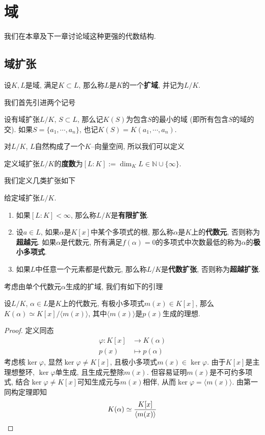 \chapter{域}\label{field}
我们在本章及下一章讨论域这种更强的代数结构.

\section{域扩张}

\begin{defn}
    设$K,L$是域, 满足$K\subset L$, 那么称$L$是$K$的一个\textbf{扩域}, 并记为$L/K$.
\end{defn}

我们首先引进两个记号
\begin{sym}
    设有域扩张$L/K$, $S\subset L$, 那么记$K(S)$为包含$S$的最小的域 (即所有包含$S$的域的交).
    如果$S=\{a_1,\cdots,a_n\}$, 也记$K(S)=K(a_1,\cdots,a_n)$.
\end{sym}

对$L/K$, $L$自然构成了一个$K$--向量空间, 所以我们可以定义
\begin{defn}
    定义域扩张$L/K$的\textbf{度数}为$[L:K]:=\dim_K{L}\in\mathbb{N}\cup\{\infty\}$.
\end{defn}

我们定义几类扩张如下
\begin{defn}
    给定域扩张$L/K$.
    \begin{enumerate}[(1)]
        \item 如果$[L:K]<\infty$, 那么称$L/K$是\textbf{有限扩张}.
        \item 设$a\in L$, 如果$\alpha$是$K[x]$中某个多项式的根, 那么称$\alpha$是$K$上的\textbf{代数元}, 否则称为\textbf{超越元}.
        如果$\alpha$是代数元, 所有满足$f(\alpha)=0$的多项式中次数最低的称为$\alpha$的\textbf{极小多项式}.
        \item 如果$L$中任意一个元素都是代数元, 那么称$L/K$是\textbf{代数扩张}, 否则称为\textbf{超越扩张}.
    \end{enumerate}
\end{defn}

考虑由单个代数元$\alpha$生成的扩域, 我们有如下的引理
\begin{lem}
    设$L/K$, $\alpha\in L$是$K$上的代数元, 有极小多项式$m(x)\in K[x]$, 那么$K(\alpha)\simeq K[x]/\langle m(x)\rangle$, 其中$\langle m(x)\rangle$是$p(x)$生成的理想.
\end{lem}
\begin{proof}
    定义同态
    \begin{align*}
        \varphi:K[x]&\to K(\alpha)\\
        p(x)&\mapsto p(\alpha)
    \end{align*}
    考虑核$\ker\varphi$, 显然$\ker\varphi\neq K[x]$, 且极小多项式$m(x)\in\ker\varphi$.
    由于$K[x]$是主理想整环, $\ker\varphi$单生成, 且生成元整除$m(x)$.
    但容易证明$m(x)$是不可约多项式, 结合$\ker\varphi\neq K[x]$可知生成元与$m(x)$相伴, 从而$\ker\varphi=\langle m(x)\rangle$.
    由第一同构定理即知
    \[K(\alpha)\simeq \frac{K[x]}{\langle m(x)\rangle}\qedhere\]
\end{proof}

